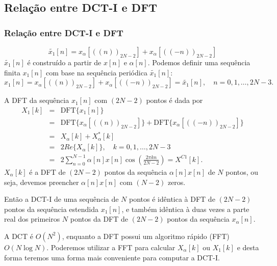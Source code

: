 \subsection{Relação entre DCT-I e DFT}
\begin{frame}[allowframebreaks]
  \frametitle{Relação entre DCT-I e DFT}

        \begin{equation}
        \tilde{x_1}[n] = x_{\alpha} \left[ ((n))_{2N-2} \right] + x_{\alpha} \left[ ((-n))_{2N-2} \right]
        \end{equation}
        $\tilde{x_1}[n]$ é construído a partir de $x[n]$ e $\alpha[n]$. Podemos definir uma sequência finita $x_1[n]$ com
        base na sequência periódica $\tilde{x_1}[n]$:
        \begin{equation}
        x_1 [n] = x_{\alpha} \left[ ((n))_{2N-2} \right] + x_{\alpha} \left[ ((-n))_{2N-2} \right] = \tilde{x_1}[n], \quad n = 0, 1, \ldots, 2N-3.
        \end{equation}

        \framebreak
        A DFT da sequência $x_1 [n]$ com $(2N-2)$ pontos é dada por
        \begin{eqnarray}
        X_1[k] &=& \mathrm{DFT}\{x_1[n]\} \\
                &=& \mathrm{DFT}\{x_{\alpha} \left[ ((n))_{2N-2} \right]\} + \mathrm{DFT}\{x_{\alpha} \left[ ((-n))_{2N-2} \right]\} \\
                &=& X_\alpha [k] + X_\alpha^\ast [k] \\
                &=& 2 \mathit{Re} \{ X_\alpha [k] \} , \quad k = 0, 1, \ldots, 2N -3 \\
                &=& 2 \sum_{n=0}^{N-1} \alpha[n] x[n] \cos \left( \frac{2 \pi k n}{2N-2} \right) = X^{C1}[k].
        \end{eqnarray}
        $X_\alpha [k]$ é a DFT de $(2N-2)$ pontos da sequência $\alpha[n]x[n]$ de $N$ pontos, ou seja, devemos
        preencher $\alpha[n]x[n]$ com $(N-2)$ zeros.

        Então a DCT-I de uma sequência de $N$ pontos é idêntica à DFT de $(2N-2)$ pontos da sequência estendida $x_1[n]$,
        e também idêntica à duas vezes a parte real dos primeiros $N$ pontos da DFT de $(2N-2)$ pontos da sequência $x_\alpha [n]$.


        A DCT é $O(N^2)$, enquanto a DFT possui um algoritmo rápido (FFT) $O(N \log N)$.
        Poderemos utilizar a FFT para calcular $X_\alpha[k]$ ou $X_1[k]$ e desta forma teremos uma forma mais
        conveniente para computar a DCT-I.


\end{frame}

